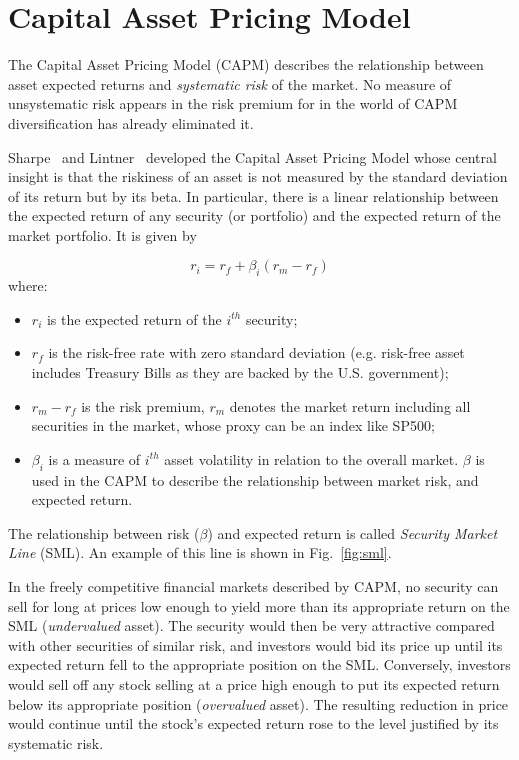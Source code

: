 \section{Capital Asset Pricing Model}
\label{sec:capm}
The Capital Asset Pricing Model (CAPM) describes the relationship between asset expected returns and \emph{systematic risk} of the market. No measure of unsystematic risk appears in the risk premium for in the world of CAPM diversification has already eliminated it.

Sharpe~\cite{bib:capm_sharpe} and Lintner~\cite{bib:capm_lintner} developed the Capital Asset Pricing Model whose central insight is that the riskiness of an asset is not measured by the standard deviation of its return but by its beta. In particular, there is a linear relationship between the expected return of any security (or portfolio) and the expected return of the market portfolio. It is given by

\begin{equation}
r_i = r_f + \beta_i(r_m-r_f)
\label{eq:capm}
\end{equation}
where:
\begin{itemize}
\item $r_i$ is the expected return of the $i^{th}$ security;
\item $r_f$ is the risk-free rate with zero standard deviation (e.g. risk-free asset includes Treasury Bills as they are backed by the U.S. government);
\item $r_m - r_f$ is the risk premium, $r_m$ denotes the market return including all securities in the market, whose proxy can be an index like SP500;
\item $\beta_i$ is a measure of $i^{th}$ asset volatility in relation to the overall market. $\beta$ is used in the CAPM to describe the relationship between market risk, and expected return.
\end{itemize}

The relationship between risk ($\beta$) and expected return is called \emph{Security Market Line} (SML). An example of this line is shown in Fig.~\ref{fig:sml}.

In the freely competitive financial markets described by CAPM, no security can sell for long at prices low enough to yield more than its appropriate return on the SML (\emph{undervalued} asset). The security would then be very attractive compared with other securities of similar risk, and investors would bid its price up until its expected return fell to the appropriate position on the SML. Conversely, investors would sell off any stock selling at a price high enough to put its expected return below its appropriate position (\emph{overvalued} asset). The resulting reduction in price would continue until the stock’s expected return rose to the level justified by its systematic risk.

